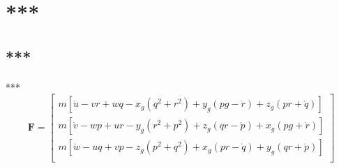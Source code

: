 \documentclass{ctexart}
\begin{document}
	\section{***}
	\subsection{***}
    \paragraph{}***
	\[
	\mathbf{F}=
	\begin{bmatrix}
		m[\dot{u}-vr+wq-x_g(q^2+r^2)+y_g(pg-\dot{r})+z_g(pr+\dot{q})]\\
		m[\dot{v}-wp+ur-y_g(r^2+p^2)+z_g(qr-\dot{p})+x_g(pg+\dot{r})]\\
		m[\dot{w}-uq+vp-z_g(p^2+q^2)+x_g(pr-\dot{q})+y_g(qr+\dot{p})]\\
	\end{bmatrix}
	\]
		
\end{document}
